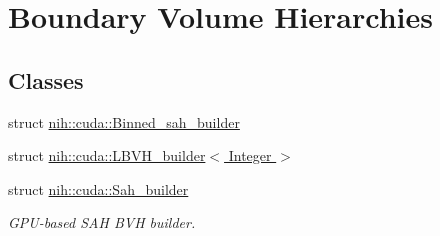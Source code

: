 \hypertarget{group__bvh}{
\section{\-Boundary \-Volume \-Hierarchies}
\label{group__bvh}
}
\subsection*{\-Classes}
\begin{DoxyCompactItemize}
\item 
struct \hyperlink{structnih_1_1cuda_1_1_binned__sah__builder}{nih\-::cuda\-::\-Binned\-\_\-sah\-\_\-builder}
\item 
struct \hyperlink{structnih_1_1cuda_1_1_l_b_v_h__builder}{nih\-::cuda\-::\-L\-B\-V\-H\-\_\-builder$<$ Integer $>$}
\item 
struct \hyperlink{structnih_1_1cuda_1_1_sah__builder}{nih\-::cuda\-::\-Sah\-\_\-builder}
\begin{DoxyCompactList}\small\item\em \-G\-P\-U-\/based \-S\-A\-H \-B\-V\-H builder. \end{DoxyCompactList}\end{DoxyCompactItemize}
